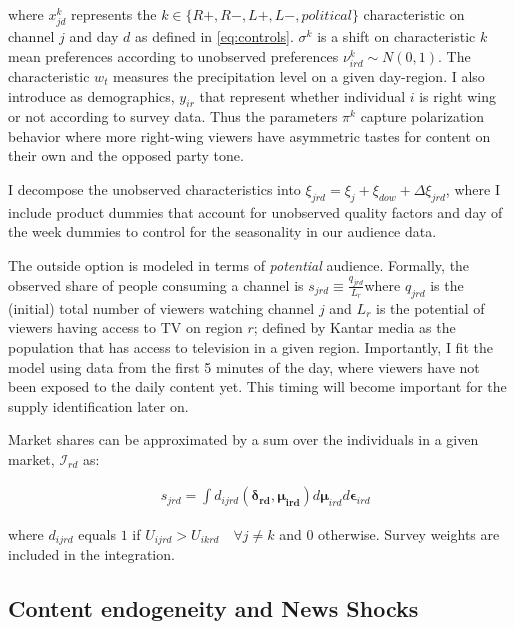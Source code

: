 \documentclass[12pt]{article}
\begin{document}
	where $ x_{jd}^k $ represents the $ k \in \{R+,R-,L+,L-,political\}$ characteristic on channel $ j $ and day $ d$ as defined in \ref{eq:controls}. $ \sigma^k $ is a shift on characteristic $ k $ mean preferences according to unobserved preferences $ \nu_{ird}^k \sim N(0,1)$.  The  characteristic $w_t$ measures the precipitation level on a given day-region. I also introduce as demographics, $ y_{ir} $ that represent whether individual $i$ is right wing or not according to survey data. Thus the parameters $\pi^k$  capture polarization behavior where more right-wing viewers have asymmetric tastes for content on their own and the opposed party tone. 
	
	
	
	I decompose the unobserved characteristics into $\xi_{jrd}= \xi_j + \xi_{dow} + \Delta \xi_{jrd}$, where I include product dummies that account for unobserved quality factors and day of the week dummies to control for the seasonality in our audience data. 
	
	The outside option is modeled in terms of \textit{potential} audience. Formally, the observed share of people consuming a channel  is $ s_{jrd}\equiv \frac{q_{jrd}}{L_{r}}$where $ q_{jrd} $ is the (initial) total number of viewers watching channel $ j $ and  $ L_{r} $ is the potential of viewers having access to TV on region $ r$; defined by Kantar media as the population that has access to television in a given region. Importantly, I fit the model using data from the first 5 minutes of the day, where viewers have not been exposed to the daily content yet. This timing will become important for the supply identification later on. 
	
	Market shares  can be approximated by a sum over the individuals in a given market, $\mathcal{I}_{rd}$ as: 
	
	
	\begin{equation}\label{eq:shares}
	\begin{aligned}
		& s_{jrd} = \int d_{ijrd}(\bm{\delta_{rd}},\bm{\mu_{ird}})d\bm{\mu}_{ird}d\bm{\epsilon}_{ird}
	\end{aligned} 
\end{equation} 
	
	where $d_{ijrd}$ equals $1$ if $U_{ijrd}>U_{ikrd} \quad \forall j\neq k$ and $0$ otherwise. Survey weights are included in the integration. 

	
	\subsection{Content endogeneity and News Shocks} \label{section:endogeneity}
	
\end{document}
